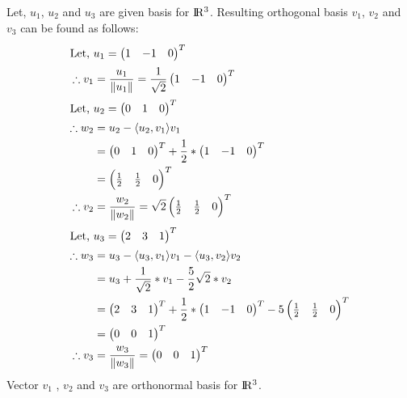 \documentclass[solution,addpoints,12pt]{exam}
\newenvironment{Solution}{\begin{solution}}{\end{solution}}
\begin{document}
\begin{questions}
\begin{parts}
    \begin{Solution}
    Let, $u_1$, $u_2$ and $u_3$ are given basis for ${\rm I\!R^3}$.
    Resulting orthogonal basis $v_1$, $v_2$ and $v_3$ can be found as follows:
    \begin{align*}
    \intertext{Let, $u_1 = \begin{pmatrix}
    1  &
    -1 &
    0
 \end{pmatrix}^T$}
    \therefore v_1 &= \frac{u_1}{\left \| u_1 \right \|}
    = \frac{1}{\sqrt{2}}\begin{pmatrix}
    1  &
    -1 &
    0
 \end{pmatrix}^T\\
 \intertext{Let, $u_2 = \begin{pmatrix}
    0  &
    1 &
    0
 \end{pmatrix}^T$}
 \therefore w_2 &= u_2 - \langle u_2,v_1 \rangle v_1\\
 &= \begin{pmatrix}
    0  &
    1 &
    0
 \end{pmatrix}^T + \frac{1}{2}*\begin{pmatrix}
    1  &
    -1 &
    0
 \end{pmatrix}^T\\
 &= \begin{pmatrix}
    \frac{1}{2}  &
    \frac{1}{2} &
    0
 \end{pmatrix}^T\\
    \therefore v_2 &= \frac{w_2}{\left \| w_2 \right \|}
    = \sqrt{2}\begin{pmatrix}
    \frac{1}{2}  &
    \frac{1}{2} &
    0
 \end{pmatrix}^T\\
 \intertext{Let, $u_3 = \begin{pmatrix}
    2  &
    3 &
    1
 \end{pmatrix}^T$}
 \therefore w_3 &= u_3 - \langle u_3,v_1 \rangle v_1 - \langle u_3,v_2 \rangle v_2\\
 &= u_3 + \frac{1}{\sqrt{2}}*v_1 -\frac{5}{2}\sqrt{2}*v_2\\ 
 &= \begin{pmatrix}
    2  &
    3 &
    1
 \end{pmatrix}^T + \frac{1}{2}*\begin{pmatrix}
    1  &
    -1 &
    0
 \end{pmatrix}^T - 5\begin{pmatrix}
    \frac{1}{2}  &
    \frac{1}{2} &
    0
 \end{pmatrix}^T\\
 &= \begin{pmatrix}
    0  &
    0 &
    1
 \end{pmatrix}^T\\
 \therefore v_3 &= \frac{w_3}{\left \| w_3 \right \|}
    = \begin{pmatrix}
    0  &
    0 &
    1
 \end{pmatrix}^T
    \end{align*}
    Vector $v_1$ , $v_2$ and $v_3$ are orthonormal basis for ${\rm I\!R^3}$.
    \end{Solution}



\end{parts}
\end{questions}
\end{document}
